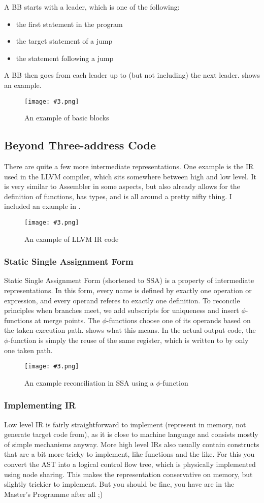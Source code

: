 \documentclass{article}
\newcommand{\fig}[4]{
	\begin{figure}[#1]
		\center
		\texttt{[image: \#3.png]}
		\caption{#4}
		\label{fig:#3}
	\end{figure}
	}
\begin{document}
A BB starts with a leader, which is one of the following:
\begin{itemize}
	\item the first statement in the program
	\item the target statement of a jump
	\item the statement following a jump
\end{itemize}
A BB then goes from each leader up to (but not including) the next leader.
 shows an example.

\fig{h}{}{bbs}{An example of basic blocks}

\subsection{Beyond Three-address Code}
There are quite a few more intermediate representations.
One example is the IR used in the LLVM compiler, which sits somewhere between high and low level.
It is very similar to Assembler in some aspects, but also already allows for the definition of functions, has types, and is all around a pretty nifty thing.
I included an example in .

\fig{h}{}{llvm}{An example of LLVM IR code}

\subsubsection{Static Single Assignment Form}
Static Single Assignment Form (shortened to SSA) is a property of intermediate representations.
In this form, every name is defined by exactly one operation or expression, and every operand referes to exactly one definition.
To reconcile principles when branches meet, we add subscripts for uniqueness and insert $\phi$-functions at merge points.
The $\phi$-functions choose one of its operands based on the taken execution path.
 shows what this means.
In the actual output code, the $\phi$-function is simply the reuse of the same register, which is written to by only one taken path.

\fig{h}{0.5}{ssa}{An example reconciliation in SSA using a $\phi$-function}

\subsubsection{Implementing IR}
Low level IR is fairly straightforward to implement (represent in memory, not generate target code from), as it is close to machine language and consists mostly of simple mechanisms anyway.
More high level IRs also usually contain constructs that are a bit more tricky to implement, like functions and the like.
For this you convert the AST into a logical control flow tree, which is physically implemented using node sharing.
This makes the representation conservative on memory, but slightly trickier to implement.
But you should be fine, you have are in the Master's Programme after all ;)
\end{document}
